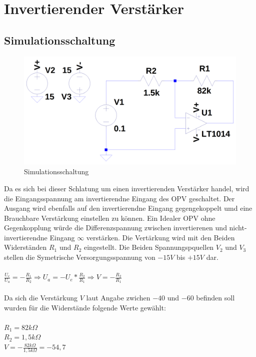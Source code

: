
\section{Invertierender Verst\"arker}
\subsection{Simulationsschaltung}
\begin{figure}[H]
  \begin{center}
    \includegraphics[width=1\textwidth]{./Schaltungen/InvertierenderVerstaerker.png}
    \caption{Simulationsschaltung}
  \end{center}
\end{figure}
\noindent
Da es sich bei dieser Schlatung um einen invertierenden Verst\"arker handel, wird die Eingangsspannung am invertierendne Eingang des OPV geschaltet.
Der Ausgang wird ebenfalls auf den invertierendne Eingang gegengekoppelt umd eine Brauchbare Verst\"arkung einstellen zu k\"onnen. Ein Idealer OPV ohne Gegenkopplung w\"urde die Differenzspannung zwischen invertierenen und nicht-invertierendne Eingang $\infty$ verst\"arken. Die Vert\"arkung wird mit den Beiden Widerst\"anden $R_1$ und $R_2$ eingestellt. Die Beiden Spannungspquellen $V_2$ und $V_3$ stellen die Symetrische Versorgungsspannung von $-15V$ bis $+15V$ dar.\\ \\
$\frac{U_e}{U_a}=-\frac{R_1}{R_2} \Rightarrow U_a=-U_e*\frac{R_2}{R_1} \Rightarrow V=-\frac{R_2}{R_1}$ \\ \\
Da sich die Verst\"arkung $V$ laut Angabe zwichen $-40$ und $-60$ befinden soll wurden f\"ur die Widerst\"ande folgende Werte gew\"ahlt: \\ \\
$R_1=82k\Omega$ \\
$R_2=1,5k\Omega$ \\
$V=-\frac{82k \Omega}{1,5k\Omega}=-54,7$

